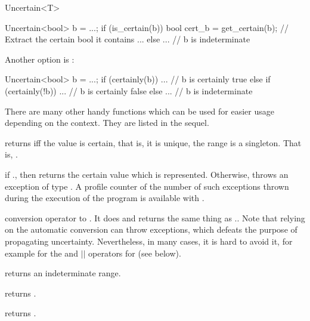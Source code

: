 \begin{ccRefClass}{Uncertain<T>}
\begin{ccExampleCode}
  Uncertain<bool> b = ...;
  if (is_certain(b))
    bool cert_b = get_certain(b); // Extract the certain bool it contains
    ...
  else
    ... // b is indeterminate
\end{ccExampleCode}

Another option is :

\begin{ccExampleCode}
  Uncertain<bool> b = ...;
  if (certainly(b))
    ... // b is certainly true
  else if (certainly(!b))
    ... // b is certainly false
  else
    ... // b is indeterminate
\end{ccExampleCode}

  There are many other handy functions which can be used for easier usage depending
  on the context.  They are listed in the sequel.

  {returns  iff the value is certain, that is, it is unique, the range
   is a singleton. That is, .}

  {if \ccVar., then returns the certain value which is represented.
   Otherwise, throws an exception of type .
   A profile counter of the number of such exceptions thrown during the execution of
   the program is available with .}

  {conversion operator to .  It does and returns the same thing as
   \ccVar..  Note that relying on the automatic conversion
   can throw exceptions, which defeats the purpose of propagating uncertainty.
   Nevertheless, in many cases, it is hard to avoid it, for example for the
   \ccc{&&} and $||$ operators for  (see below).}


  \def\ccTagRmEigenClassName{\ccFalse}
  {returns an indeterminate range.}


  {returns .}

  {returns .}


\end{ccRefClass}
